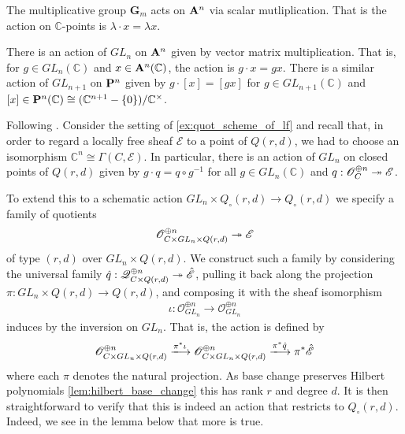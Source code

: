 \documentclass[12pt]{ociamthesis}  %
\begin{document}
\begin{example}
  The multiplicative group $\mathbf G_m$ acts on $\mathbf{A}^{n}_{}$
  via scalar mutliplication. That is the action on $\mathbb C$-points
  is $\lambda\cdot x = \lambda x$.
\end{example}

\begin{example}
  There is an action of $GL_n$ on $\mathbf{A}^{n}_{}$ given by vector
  matrix multiplication. That is, for $g\in GL_n(\mathbb C)$
  and $x\in\mathbf{A}^{n}_{}(\mathbb C)$, the action is $g\cdot x = gx$.
  There is a similar action of $GL_{n+1}$ on $\mathbf{P}^{n}_{}$
  given by $g\cdot[x] = [gx]$ for $g\in GL_{n+1}(\mathbb C)$
  and $[x]\in\mathbf{P}^{n}_{}(\mathbb C) \cong (\mathbb C^{n+1} - \{0\})/\mathbb C^\times$.
\end{example}

\begin{example}\label{ex:lf_action}
  Following \cite[Lemma 8.49]{hoskins2016}.
  Consider the setting of \ref{ex:quot_scheme_of_lf} and recall
  that, in order to regard a locally free sheaf $\mathscr E$ to a point of
  $Q(r,d)$, we had to choose an isomorphism
  $\mathbb C^n \cong \Gamma(C,\mathscr E)$. In particular, there
  is an action of $GL_n$ on closed points of $Q(r,d)$
  given by $g\cdot q = q\circ g^{-1}$ for all $g\in GL_n(\mathbb C)$
  and $q : \mathscr O^{\oplus n}_C \twoheadrightarrow \mathscr E$.

  To extend this to a schematic action $GL_n \times Q_\circ(r,d) \to Q_\circ(r,d)$
  we specify a family of quotients
  \begin{align*}
    \mathscr O^{\oplus n}_{C\times GL_n\times Q(r,d)}\twoheadrightarrow \mathscr E
  \end{align*}
  of type $(r,d)$ over $GL_n\times Q(r,d)$. We construct such a family by
  considering the universal family $\hat q:\mathscr Q^{\oplus n}_{C\times Q(r,d)}\twoheadrightarrow \hat{\mathscr E}$,
  pulling it back along the projection $\pi:GL_n\times Q(r,d)\to Q(r,d)$,
  and composing it with the sheaf isomorphism
  \begin{align*}
    \iota : \mathscr O^{\oplus n}_{GL_n} \to \mathscr O^{\oplus n}_{GL_n}
  \end{align*}
  induces by the inversion on $GL_n$. That is, the action is defined
  by
  \begin{align*}
    \mathscr O^{\oplus n}_{C\times GL_n\times Q(r,d)}
    \xlongrightarrow{\pi^*\iota}
    \mathscr O^{\oplus n}_{C\times GL_n\times Q(r,d)}
    \xlongrightarrow{\pi^*\hat q}
    \pi^*\hat{\mathscr E}
  \end{align*}
  where each $\pi$ denotes the natural projection. As base change
  preserves Hilbert polynomials \ref{lem:hilbert_base_change} this
  has rank $r$ and degree $d$. It is then straightforward to verify
  that this is indeed an action that restricts to $Q_\circ(r,d)$.
  Indeed, we see in the lemma below that more is true.
\end{example}
\end{document}
